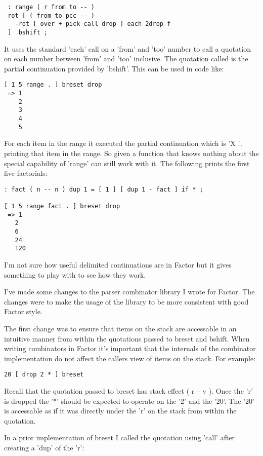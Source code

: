 \begin{verbatim}
 : range ( r from to -- )
 rot [ ( from to pcc -- )
   -rot [ over + pick call drop ] each 2drop f
 ]  bshift ;
\end{verbatim}


It uses the standard 'each' call on a 'from' and 'too' number to call
a quotation on each number between 'from' and 'too' inclusive. The
quotation called is the partial continuation provided by
'bshift'. This can be used in code like:

\begin{verbatim}
[ 1 5 range . ] breset drop
 => 1
    2
    3
    4
    5
\end{verbatim}


For each item in the range it executed the partial continuation which
is 'X .', printing that item in the range. So given a function that
knows nothing about the special capability of 'range' can still work
with it. The following prints the first five factorials:

\begin{verbatim}
: fact ( n -- n ) dup 1 = [ 1 ] [ dup 1 - fact ] if * ;

[ 1 5 range fact . ] breset drop
 => 1
   2
   6
   24
   120
\end{verbatim}


I'm not sure how useful delimited continuations are in Factor but it
 gives something to play with to see how they work.

I've made some changes to the parser combinator library I wrote for
 Factor. The changes were to make the usage of the library to be more
 consistent with good Factor style.

The first change was to ensure that items on the stack are accessable
 in an intuitive manner from within the quotations passed to breset
 and bshift. When writing combinators in Factor it's important that
 the internals of the combinator implementation do not affect the
 callers view of items on the stack. For example:

\begin{verbatim}
20 [ drop 2 * ] breset
\end{verbatim}


Recall that the quotation passed to breset has stack effect ( r -- v
). Once the 'r' is dropped the '*' should be expected to operate on
the '2' and the '20'. The '20' is accessable as if it was directly
under the 'r' on the stack from within the quotation.

In a prior implementation of breset I called the quotation using
'call' after creating a 'dup' of the 'r':


